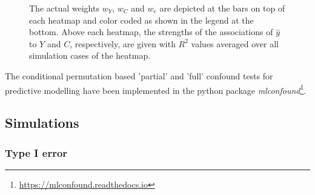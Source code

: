 \documentclass{article}
\begin{document}
\begin{figure}[!b]
{  The actual weights $w_{Y}$, $w_{C}$ and $w_{e}$ are depicted at the bars on top of each heatmap and color coded as shown in the legend at the bottom. Above each heatmap, the strengths of the associations of $\hat{y}$ to $Y$ and $C$, respectively, are given with $R^2$ values averaged over all simulation cases of the heatmap.
  }
  \label{fig:sim-normal}
\end{figure}

The conditional permutation based 'partial' and 'full' confound tests for predictive modelling have been implemented in the python package \emph{mlconfound}\footnote{\href{https://mlconfound.readthedocs.io}{https://mlconfound.readthedocs.io}}.

\subsection{Simulations}

\subsubsection*{Type I error}
\end{document}
